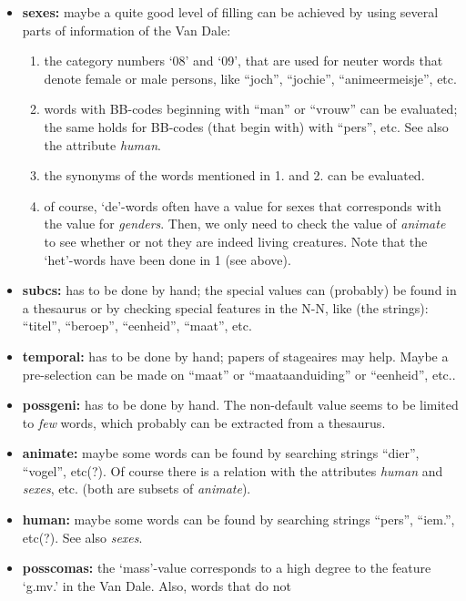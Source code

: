 \begin{itemize}
  \item {\bf sexes:} maybe a quite good level of filling can be achieved by 
        using several parts of information of the Van Dale:
\begin{enumerate}
     \item the category numbers `08' and `09', that are used for neuter words 
           that denote female or male persons, like ``joch'', 
           ``jochie'', ``animeermeisje'', etc.
     \item words with BB-codes beginning with ``man'' or ``vrouw'' can be 
           evaluated; the same holds for BB-codes (that begin with) with 
           ``pers'', etc. See also the attribute {\em human}.
     \item the synonyms of the words mentioned in 1. and 2. can be evaluated.
     \item of course, `de'-words often have a value for sexes that corresponds 
           with the value for {\em genders}. Then, we only need to check the
           value of {\em animate} to see whether or not they are indeed living 
           creatures.
           Note that the `het'-words have been done in 1 (see above).
\end{enumerate}
  \item {\bf subcs:} has to be done by hand; the special values can (probably) 
        be found in a thesaurus or by checking special features in the N-N,
        like (the strings):
        ``titel'', ``beroep'', ``eenheid'', ``maat'', etc.
  \item {\bf temporal:} has to be done by hand; papers of stageaires may help.
        Maybe a pre-selection can be made on ``maat'' or ``maataanduiding'' or 
        ``eenheid'', etc.. 
  \item {\bf possgeni:} has to be done by hand. The non-default value seems to 
        be limited to {\em few} words, which probably can be extracted from a
        thesaurus.
  \item {\bf animate:} maybe some words can be found by searching strings
        ``dier'', ``vogel'', etc(?). Of course there is a relation with the 
        attributes {\em human} and {\em sexes}, etc. (both are subsets 
        of {\em animate}). 
  \item {\bf human:} maybe some words can be found by searching strings
        ``pers'', ``iem.'', etc(?). See also {\em sexes}.
  \item {\bf posscomas:} the `mass'-value corresponds to a high 
        degree to the feature `g.mv.' in the Van Dale. Also, words that do not 

\end{itemize}
